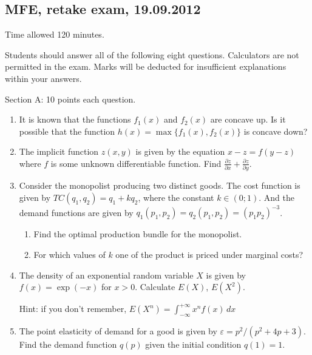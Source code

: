 \subsection{MFE, retake exam, 19.09.2012}

Time allowed 120 minutes.

Students should answer all of the following eight questions. Calculators are not permitted in the exam. Marks will be deducted for insufficient explanations within your answers.

Section A: 10 points  each question.
\begin{enumerate}


\item It is known that the functions $f_1(x)$ and $f_2(x)$ are concave up. Is it possible that the function $h(x)=\max\{f_1(x),f_2(x)\}$ is concave down?

\item The implicit function $z(x,y)$ is given by the equation $x-z=f(y-z)$ where $f$ is some unknown differentiable function. Find $\frac{\partial z}{\partial x}+\frac{\partial z}{\partial y}$.
\item Consider the monopolist producing two distinct goods. The cost function is given by $TC(q_1,q_2)=q_1+kq_2$, where the constant $k\in (0;1)$. And the demand functions are given by $q_1(p_1,p_2)=q_2(p_1,p_2)=(p_1p_2)^{-3}$.
\begin{enumerate}
\item Find the optimal production bundle for the monopolist.
\item For which values of $k$ one of the product is priced under marginal costs? %
\end{enumerate}
\item The density of an exponential random variable $X$ is given by $f(x)=\exp(-x)$ for $x>0$. Calculate $E(X)$, $E(X^2)$.

Hint: if you don't remember, $E(X^n)=\int_{-\infty}^{+\infty}x^nf(x)\,dx$
\item The point elasticity of demand for a good is given by $\varepsilon=p^2/(p^2+4p+3)$. Find the demand function $q(p)$ given the initial condition $q(1)=1$.


\end{enumerate}
